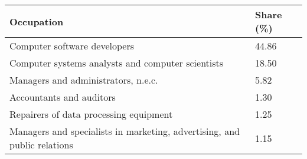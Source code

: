 

\begin{tabular}[t]{ll}
\toprule
Occupation & Share (\%)\\
\midrule
Computer software developers & 44.86\\
Computer systems analysts and computer scientists & 18.50\\
Managers and administrators, n.e.c. & 5.82\\
Accountants and auditors & 1.30\\
Repairers of data processing equipment & 1.25\\
Managers and specialists in marketing, advertising, and public relations & 1.15\\
\bottomrule
\end{tabular}

